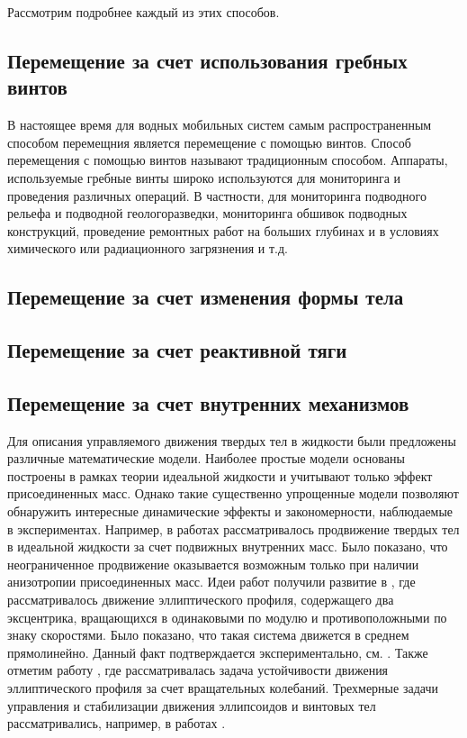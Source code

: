 Рассмотрим подробнее каждый из этих способов.

\subsection{Перемещение за счет использования гребных винтов}\label{sec:ch1/sec2}

В настоящее время для водных мобильных систем самым распространенным способом перемещния является перемещение с помощью винтов. Способ перемещения с помощью винтов называют традиционным способом. Аппараты, используемые гребные винты широко используются для мониторинга и проведения различных операций. В частности, для мониторинга подводного рельефа и подводной геологоразведки, мониторинга обшивок подводных конструкций, проведение ремонтных работ на больших глубинах и в условиях химического или радиационного загрязнения и т.д. 





\subsection{Перемещение за счет изменения формы тела}\label{sec:ch1/sec3}


\subsection{Перемещение за счет реактивной тяги}\label{sec:ch1/sec4}



\subsection{Перемещение за счет внутренних механизмов}\label{sec:ch1/sec5}

Для описания управляемого движения твердых тел в жидкости были предложены различные математические модели. Наиболее простые модели основаны построены в рамках теории идеальной жидкости и учитывают только эффект присоединенных масс. Однако такие существенно упрощенные модели позволяют обнаружить интересные динамические эффекты и закономерности, наблюдаемые в экспериментах. Например, в работах \cite{Kozlov_Ramodanov_PMM_2001, Kozlov_Onichenko} рассматривалось продвижение твердых тел в идеальной жидкости за счет подвижных внутренних масс. Было показано, что неограниченное продвижение оказывается возможным только при наличии анизотропии присоединенных масс. Идеи работ \cite{Kozlov_Ramodanov_PMM_2001, Kozlov_Onichenko} получили развитие в \cite{Vetchanin_Kilin_2016}, где рассматривалось движение эллиптического профиля, содержащего два эксцентрика, вращающихся в одинаковыми по модулю и противоположными по знаку скоростями. Было показано, что такая система движется в среднем прямолинейно. Данный факт подтверждается экспериментально, см. \cite{Klenov_Kilin_2016}. Также отметим работу \cite{Jing_Kanso_2013}, где рассматривалась задача устойчивости движения эллиптического профиля за счет вращательных колебаний. Трехмерные задачи управления и стабилизации движения эллипсоидов и винтовых тел рассматривались, например, в работах \cite{Borisov_et_al_2017, Vetchanin_Mamaev_2017, Vetchanin_et_al_2016, Woolsey_Leonard_1999}.


